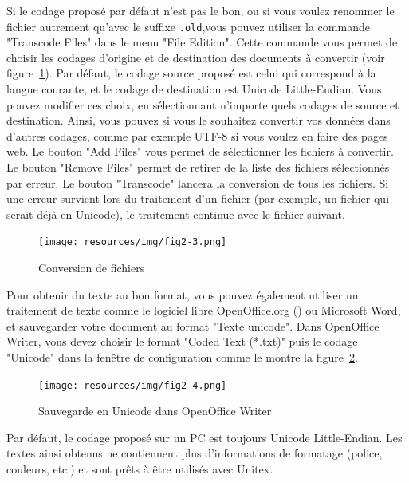 \bigskip
\noindent Si le codage proposé par défaut n’est pas le bon, ou si vous voulez renommer le fichier
autrement qu’avec le suffixe \verb$.old$,vous pouvez utiliser la commande "Transcode Files"
dans le menu "File Edition". Cette commande vous permet de choisir les codages d’origine
et de destination des documents à convertir (voir figure~\ref{transcoding}). Par défaut, le codage
source proposé est celui qui correspond à la langue courante, et le codage de destination est
Unicode Little-Endian. Vous pouvez modifier ces choix, en sélectionnant n’importe quels
codages de source et destination. Ainsi, vous pouvez si vous le souhaitez convertir vos données
dans d’autres codages, comme par exemple UTF-8 si vous voulez en faire des pages
web. Le bouton "Add Files" vous permet de sélectionner les fichiers à convertir. Le bouton
"Remove Files" permet de retirer de la liste des fichiers sélectionnés par erreur. Le bouton
"Transcode" lancera la conversion de tous les fichiers. Si une erreur survient lors du traitement
d’un fichier (par exemple, un fichier qui serait déjà en Unicode), le traitement continue
avec le fichier suivant.


\begin{figure}[!ht]
\begin{center}
\texttt{[image: resources/img/fig2-3.png]}
\caption{\label{transcoding}Conversion de fichiers}
\end{center}
\end{figure}

\noindent Pour obtenir du texte au bon format, vous pouvez également utiliser un traitement de
texte comme le logiciel libre OpenOffice.org (\cite{OpenOffice}) ou Microsoft Word, et sauvegarder
votre document au format "Texte unicode". Dans OpenOffice Writer, vous devez choisir le format
"Coded Text (*.txt)" puis le codage "Unicode" dans la fenêtre de configuration comme le montre la
figure~\ref{OfficeWriter}.

\begin{figure}[!ht]
\begin{center}
\texttt{[image: resources/img/fig2-4.png]}
\caption{\label{OfficeWriter}Sauvegarde en Unicode dans OpenOffice Writer}
\end{center}
\end{figure}

\noindent Par défaut, le codage proposé sur un PC est toujours Unicode Little-Endian. Les textes 
ainsi obtenus ne contiennent plus d’informations de formatage (police, couleurs, etc.) et sont
prêts à être utilisés avec Unitex.


